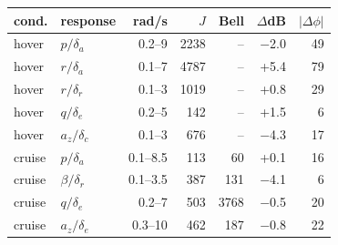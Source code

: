 \begin{tabular}{@{}llrrrrr@{}}
\toprule
cond. & response & rad/s & $J$ & Bell & $\Delta$dB & $|\Delta\phi|$ \\
\midrule
hover & $p/\delta_a$ & 0.2--9 & 2238 & -- & $-$2.0 & 49 \\
hover & $r/\delta_a$ & 0.1--7 & 4787 & -- & +5.4 & 79 \\
hover & $r/\delta_r$ & 0.1--3 & 1019 & -- & +0.8 & 29 \\
hover & $q/\delta_e$ & 0.2--5 & 142 & -- & +1.5 & 6 \\
hover & $a_z/\delta_c$ & 0.1--3 & 676 & -- & $-$4.3 & 17 \\
cruise & $p/\delta_a$ & 0.1--8.5 & 113 & 60 & +0.1 & 16 \\
cruise & $\beta/\delta_r$ & 0.1--3.5 & 387 & 131 & $-$4.1 & 6 \\
cruise & $q/\delta_e$ & 0.2--7 & 503 & 3768 & $-$0.5 & 20 \\
cruise & $a_z/\delta_e$ & 0.3--10 & 462 & 187 & $-$0.8 & 22 \\
\bottomrule
\end{tabular}
